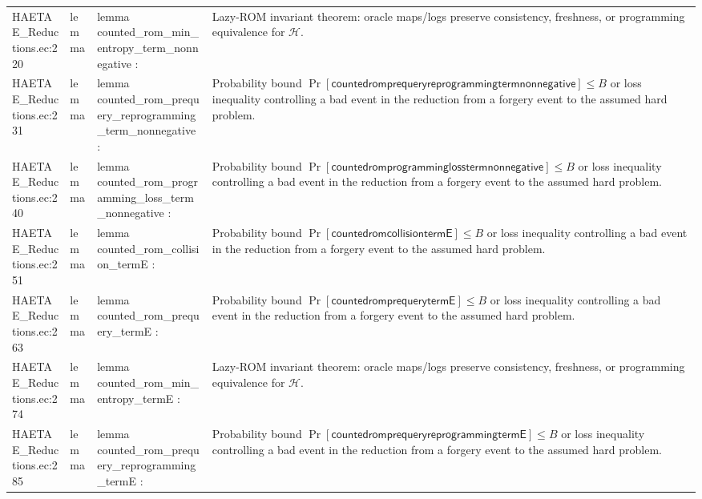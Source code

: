 \documentclass[10pt]{article}
\begin{document}
\begin{longtable}{L{0.11\textwidth}L{0.055\textwidth}L{0.385\textwidth}L{0.41\textwidth}}
HAETAE\_\allowbreak{}Reductions.\allowbreak{}ec:\allowbreak{}220 & lemma & {\ttfamily\scriptsize lemma counted\_\allowbreak{}rom\_\allowbreak{}min\_\allowbreak{}entropy\_\allowbreak{}term\_\allowbreak{}nonnegative :} & Lazy-ROM invariant theorem: oracle maps/logs preserve consistency, freshness, or programming equivalence for $\mathcal H$. \\
HAETAE\_\allowbreak{}Reductions.\allowbreak{}ec:\allowbreak{}231 & lemma & {\ttfamily\scriptsize lemma counted\_\allowbreak{}rom\_\allowbreak{}prequery\_\allowbreak{}reprogramming\_\allowbreak{}term\_\allowbreak{}nonnegative :} & Probability bound $\Pr[\mathsf{countedromprequeryreprogrammingtermnonnegative}]\le B$ or loss inequality controlling a bad event in the reduction from a forgery event to the assumed hard problem. \\
HAETAE\_\allowbreak{}Reductions.\allowbreak{}ec:\allowbreak{}240 & lemma & {\ttfamily\scriptsize lemma counted\_\allowbreak{}rom\_\allowbreak{}programming\_\allowbreak{}loss\_\allowbreak{}term\_\allowbreak{}nonnegative :} & Probability bound $\Pr[\mathsf{countedromprogramminglosstermnonnegative}]\le B$ or loss inequality controlling a bad event in the reduction from a forgery event to the assumed hard problem. \\
HAETAE\_\allowbreak{}Reductions.\allowbreak{}ec:\allowbreak{}251 & lemma & {\ttfamily\scriptsize lemma counted\_\allowbreak{}rom\_\allowbreak{}collision\_\allowbreak{}termE :} & Probability bound $\Pr[\mathsf{countedromcollisiontermE}]\le B$ or loss inequality controlling a bad event in the reduction from a forgery event to the assumed hard problem. \\
HAETAE\_\allowbreak{}Reductions.\allowbreak{}ec:\allowbreak{}263 & lemma & {\ttfamily\scriptsize lemma counted\_\allowbreak{}rom\_\allowbreak{}prequery\_\allowbreak{}termE :} & Probability bound $\Pr[\mathsf{countedromprequerytermE}]\le B$ or loss inequality controlling a bad event in the reduction from a forgery event to the assumed hard problem. \\
HAETAE\_\allowbreak{}Reductions.\allowbreak{}ec:\allowbreak{}274 & lemma & {\ttfamily\scriptsize lemma counted\_\allowbreak{}rom\_\allowbreak{}min\_\allowbreak{}entropy\_\allowbreak{}termE :} & Lazy-ROM invariant theorem: oracle maps/logs preserve consistency, freshness, or programming equivalence for $\mathcal H$. \\
HAETAE\_\allowbreak{}Reductions.\allowbreak{}ec:\allowbreak{}285 & lemma & {\ttfamily\scriptsize lemma counted\_\allowbreak{}rom\_\allowbreak{}prequery\_\allowbreak{}reprogramming\_\allowbreak{}termE :} & Probability bound $\Pr[\mathsf{countedromprequeryreprogrammingtermE}]\le B$ or loss inequality controlling a bad event in the reduction from a forgery event to the assumed hard problem. \\

\end{longtable}
\end{document}
